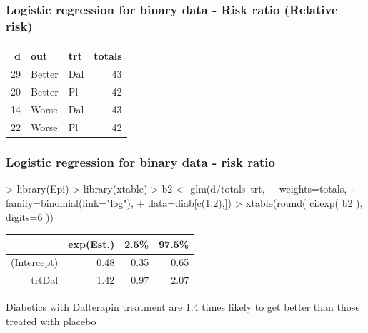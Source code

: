 \documentclass[handout,12pt,dvipsnames,t]{beamer}
\begin{document}
\begin{frame}[fragile]
\frametitle{Logistic regression for binary data - Risk ratio (Relative risk)}

\footnotesize{
\begin{Schunk}
\begin{table}[ht]
\centering
\begin{tabular}{rllr}
  \hline
d & out & trt & totals \\ 
  \hline
29 & Better & Dal & 43 \\ 
  20 & Better & Pl & 42 \\ 
  14 & Worse & Dal & 43 \\ 
  22 & Worse & Pl & 42 \\ 
   \hline
\end{tabular}
\end{table}\end{Schunk}
}

\end{frame}

\begin{frame}[fragile]
\frametitle{Logistic regression for binary data - risk ratio}

\begin{Schunk}
\begin{Sinput}
> library(Epi)
> library(xtable)
> b2 <- glm(d/totals~trt, 
+           weights=totals,
+           family=binomial(link="log"),
+           data=diab[c(1,2),])
> xtable(round( ci.exp( b2 ), digits=6 ))
\end{Sinput}
\begin{table}[ht]
\centering
\begin{tabular}{rrrr}
  \hline
 & exp(Est.) & 2.5\% & 97.5\% \\ 
  \hline
(Intercept) & 0.48 & 0.35 & 0.65 \\ 
  trtDal & 1.42 & 0.97 & 2.07 \\ 
   \hline
\end{tabular}
\end{table}\end{Schunk}

Diabetics with Dalterapin treatment are 1.4 times likely to get better than those treated with placebo

\end{frame}
\end{document}
